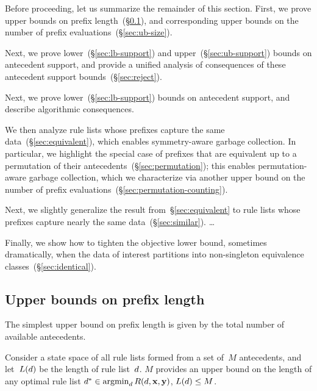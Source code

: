 Before proceeding, let us summarize the remainder of this section.
%
First, we prove upper bounds on prefix
length~(\S\ref{sec:ub-prefix-length}),
and corresponding upper bounds on the number of
prefix evaluations~(\S\ref{sec:ub-size}).
%
\begin{arxiv}
Next, we prove lower~(\S\ref{sec:lb-support})
and upper~(\S\ref{sec:ub-support}) bounds on antecedent support,
and provide a unified analysis of consequences of
these antecedent support bounds~(\S\ref{sec:reject}).
\end{arxiv}
\begin{kdd}
Next, we prove lower~(\S\ref{sec:lb-support}) bounds on
antecedent support, and describe algorithmic consequences.
\end{kdd}
%
We then analyze rule lists whose prefixes
capture the same data~(\S\ref{sec:equivalent}),
which enables symmetry-aware garbage collection.
%
In particular, we highlight the special case of prefixes
that are equivalent up to a permutation of their
antecedents~(\S\ref{sec:permutation});
this enables permutation-aware garbage collection,
which we characterize via another upper bound on
the number of prefix evaluations~(\S\ref{sec:permutation-counting}).
%
\begin{arxiv}
Next, we slightly generalize the result from~\S\ref{sec:equivalent}
to rule lists whose prefixes capture nearly the same data~(\S\ref{sec:similar}).
%
\dots
\end{arxiv}
%
Finally, we show how to tighten the objective lower bound,
sometimes dramatically, when the data of interest partitions
into non-singleton equivalence classes~(\S\ref{sec:identical}).

\subsection{Upper bounds on prefix length}
\label{sec:ub-prefix-length}

The simplest upper bound on prefix length is given by the total
number of available antecedents.

\begin{proposition}
\label{prop:trivial-length}
Consider a state space of all rule lists formed from
a set of~$M$ antecedents,
and let~$L({d})$ be the length of rule list~${d}$.
%
$M$ provides an upper bound on the length of
any optimal rule list
${d^* \in \operatorname*{argmin}_{d} R({d}, \mathbf{x}, \mathbf{y})}$,
\ie ${L({d}) \le M}$.
\end{proposition}

